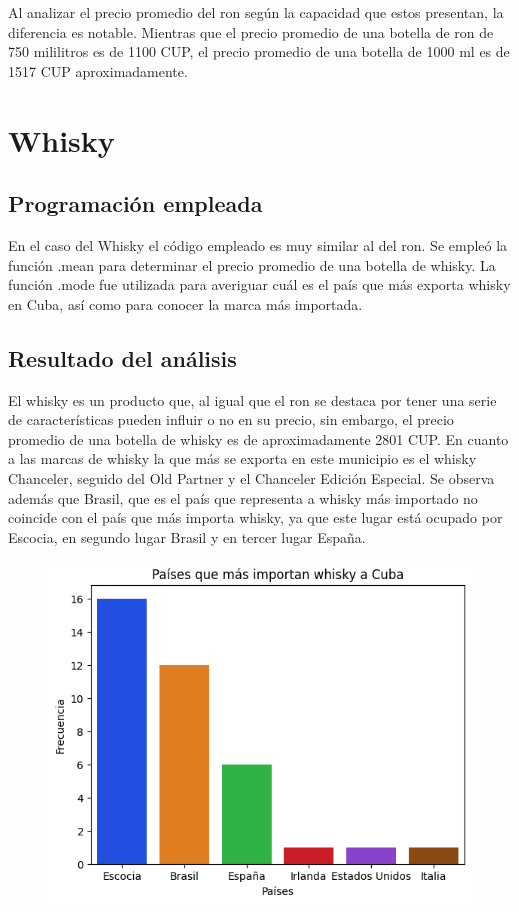\documentclass[a4paper,12pt]{article}
\begin{document}
		Al analizar el precio promedio del ron según la capacidad que estos presentan, la diferencia es notable. Mientras que el precio promedio de una botella de ron de 750 mililitros es de 1100 CUP, el precio promedio de una botella de 1000 ml es de 1517 CUP aproximadamente.
		
	\section{Whisky}
		\subsection{Programación empleada}
		
		En el caso del Whisky el código empleado es muy similar al del ron. Se empleó la función .mean para determinar el precio promedio de una botella de whisky. La función .mode fue utilizada para averiguar cuál es el país que más exporta whisky en Cuba, así como para conocer la marca más importada.
		
		\subsection{Resultado del análisis}
		El whisky es un producto que, al igual que el ron se destaca por tener una serie de características pueden influir o no en su precio, sin embargo, el precio promedio de una botella de whisky es de aproximadamente 2801 CUP. En cuanto a las marcas de whisky la que más se exporta en este municipio es el whisky Chanceler, seguido del Old Partner y el Chanceler Edición Especial. Se observa además que Brasil, que es el país que representa a whisky más importado no coincide con el país que más importa whisky, ya que este lugar está ocupado por Escocia, en segundo lugar Brasil y en tercer lugar España.
		
			\begin{figure}[h]
			\centering
			\includegraphics[width=12cm]{whisky export.png}
			\label{fig:Comportamiento del whisky por países}
		\end{figure}
		
\end{document}
